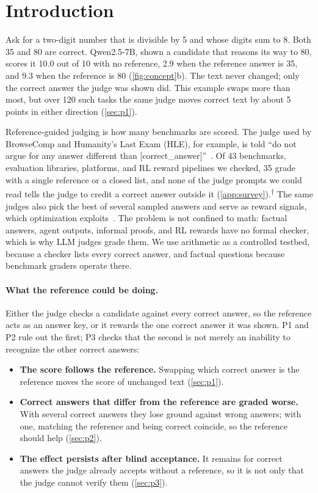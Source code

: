 \documentclass{article}
\newcommand{\ph}{\textsuperscript{$\dagger$}}
\begin{document}
\section{Introduction}
\label{sec:intro}

Ask for a two-digit number that is divisible by 5 and whose digits sum to 8.
Both 35 and 80 are correct.
Qwen2.5-7B, shown a candidate that reasons its way to 80, scores it 10.0 out of 10 with no reference, 2.9 when the reference answer is 35, and 9.3 when the reference is 80 (\cref{fig:concept}b).
The text never changed; only the correct answer the judge was shown did.
This example swaps more than most, but over 120 such tasks the same judge moves correct text by about 5 points in either direction (\cref{sec:p1}).

Reference-guided judging is how many benchmarks are scored.
The judge used by BrowseComp and Humanity's Last Exam (HLE), for example, is told ``do not argue for any answer different than [correct\_answer]''~\citep{wei2025browsecomp,phan2025hle}.
Of 43 benchmarks, evaluation libraries, platforms, and RL reward pipelines we checked, 35 grade with a single reference or a closed list, and none of the judge prompts we could read tells the judge to credit a correct answer outside it (\cref{app:survey}).\ph{}
The same judges also pick the best of several sampled answers and serve as reward signals, which optimization exploits~\citep{gao2022scaling}.
The problem is not confined to math: factual answers, agent outputs, informal proofs, and RL rewards have no formal checker, which is why LLM judges grade them. We use arithmetic as a controlled testbed, because a checker lists every correct answer, and factual questions because benchmark graders operate there.

\paragraph{What the reference could be doing.}
Either the judge checks a candidate against every correct answer, so the reference acts as an answer key, or it rewards the one correct answer it was shown.
P1 and P2 rule out the first; P3 checks that the second is not merely an inability to recognize the other correct answers:
\begin{itemize}[leftmargin=1.5em,itemsep=0pt,topsep=0pt]
\item[\textbf{P1}] \textbf{The score follows the reference.} Swapping which correct answer is the reference moves the score of unchanged text (\cref{sec:p1}).
\item[\textbf{P2}] \textbf{Correct answers that differ from the reference are graded worse.} With several correct answers they lose ground against wrong answers; with one, matching the reference and being correct coincide, so the reference should help (\cref{sec:p2}).
\item[\textbf{P3}] \textbf{The effect persists after blind acceptance.} It remains for correct answers the judge already accepts without a reference, so it is not only that the judge cannot verify them (\cref{sec:p3}).
\end{itemize}
\end{document}
